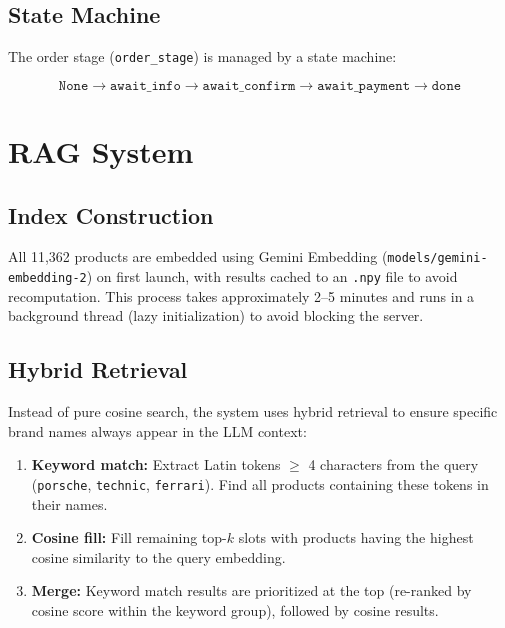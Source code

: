 \documentclass[12pt, a4paper]{report}
\begin{document}
\subsection{State Machine}

The order stage (\texttt{order\_stage}) is managed by a state machine:

\begin{equation}
  \texttt{None} \rightarrow \texttt{await\_info} \rightarrow
  \texttt{await\_confirm} \rightarrow \texttt{await\_payment} \rightarrow
  \texttt{done}
\end{equation}

\section{RAG System}

\subsection{Index Construction}

All 11,362 products are embedded using Gemini Embedding
(\texttt{models/gemini-embedding-2}) on first launch,
with results cached to an \texttt{.npy} file to avoid recomputation.
This process takes approximately 2--5 minutes and runs in a background thread
(lazy initialization) to avoid blocking the server.

\subsection{Hybrid Retrieval}

Instead of pure cosine search, the system uses hybrid retrieval
to ensure specific brand names always appear in the LLM context:

\begin{enumerate}
  \item \textbf{Keyword match:} Extract Latin tokens $\geq$ 4 characters
        from the query (\texttt{porsche}, \texttt{technic}, \texttt{ferrari}).
        Find all products containing these tokens in their names.
  \item \textbf{Cosine fill:} Fill remaining top-$k$ slots with products
        having the highest cosine similarity to the query embedding.
  \item \textbf{Merge:} Keyword match results are prioritized at the top
        (re-ranked by cosine score within the keyword group),
        followed by cosine results.
\end{enumerate}
\end{document}
